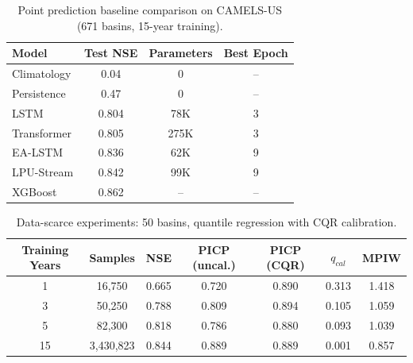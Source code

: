 
\begin{table}[h]
\caption{Point prediction baseline comparison on CAMELS-US (671 basins, 15-year training).}
\label{tab:baselines}
\begin{tabular}{lccc}
\hline
Model & Test NSE & Parameters & Best Epoch \\
\hline
Climatology & 0.04 & 0 & -- \\
Persistence & 0.47 & 0 & -- \\
LSTM & 0.804 & 78K & 3 \\
Transformer & 0.805 & 275K & 3 \\
EA-LSTM & 0.836 & 62K & 9 \\
LPU-Stream & 0.842 & 99K & 9 \\
XGBoost & 0.862 & -- & -- \\
\hline
\end{tabular}
\end{table}


\begin{table}[h]
\caption{Data-scarce experiments: 50 basins, quantile regression with CQR calibration.}
\label{tab:scarce}
\begin{tabular}{ccccccc}
\hline
Training Years & Samples & NSE & PICP (uncal.) & PICP (CQR) & $q_{cal}$ & MPIW \\
\hline
1 & 16,750 & 0.665 & 0.720 & 0.890 & 0.313 & 1.418 \\
3 & 50,250 & 0.788 & 0.809 & 0.894 & 0.105 & 1.059 \\
5 & 82,300 & 0.818 & 0.786 & 0.880 & 0.093 & 1.039 \\
15 & 3,430,823 & 0.844 & 0.889 & 0.889 & 0.001 & 0.857 \\
\hline
\end{tabular}
\end{table}


